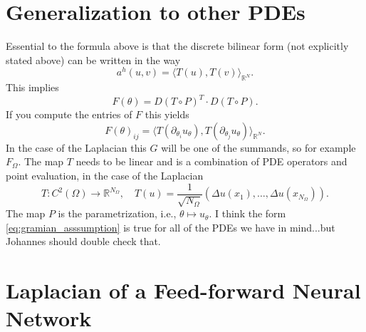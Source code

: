 \documentclass[11pt]{article}
\theoremstyle{definition}
\theoremstyle{plain}
\begin{document}
\section{Generalization to other PDEs}
Essential to the formula above is that the discrete bilinear form (not explicitly stated above) can be written in the way
\begin{equation}\label{eq:gramian_asssumption}
  a^h(u,v)
  =
  \langle T(u), T(v) \rangle_{\mathbb R^N}.
\end{equation}
This implies
\begin{equation*}
  F(\theta) = D(T\circ P)^T \cdot D(T \circ P).
\end{equation*}
If you compute the entries of $F$ this yields
\begin{equation*}
  F(\theta)_{ij} = \langle T(\partial_{\theta_i}u_\theta), T(\partial_{\theta_j}u_\theta) \rangle_{\mathbb R^N}.
\end{equation*}
In the case of the Laplacian this $G$ will be one of the summands, so for example $F_\Omega$.
The map $T$ needs to be linear and is a combination of PDE operators and point evaluation, in the case of the Laplacian
\begin{equation*}
  T:C^2(\Omega) \to \mathbb R^{N_\Omega}, \quad T(u) = \frac{1}{\sqrt{N_{\Omega}}}(\Delta u(x_1), \dots, \Delta u(x_{N_{\Omega}})).
\end{equation*}
The map $P$ is the parametrization, i.e., $\theta\mapsto u_\theta$.
I think the form \eqref{eq:gramian_asssumption} is true for all of the PDEs we have in mind...but Johannes should double check that.

\section{Laplacian of a Feed-forward Neural Network}




\end{document}
